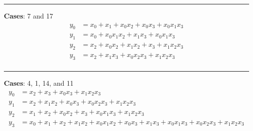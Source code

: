 \begin{minipage}{.8\textwidth}


\hrule
\vspace{2em}

\noindent 
\textbf{Cases}: 7 and 17
\begin{align*}
y_0 & = x_0 + x_1 + x_0x_2 + x_0x_3 + x_0x_1x_3 \\
y_1 & = x_0 + x_0x_1x_2 + x_1x_3 + x_0x_1x_3 \\
y_2 & = x_2 + x_0x_2 + x_1x_2 + x_3 + x_1x_2x_3 \\
y_3 & = x_2 + x_1x_3 + x_0x_2x_3 + x_1x_2x_3 \\
\end{align*}
\vspace{-1em}



\hrule
\vspace{2em}

\noindent 

\textbf{Cases}: 4, 1, 14, and 11
\begin{align*}
y_0 & = x_2 + x_3 + x_0x_3 + x_1x_2x_3 \\
y_1 & = x_2 + x_1x_2 + x_0x_3 + x_0x_2x_3 + x_1x_2x_3 \\
y_2 & = x_1 + x_2 + x_0x_2 + x_3 + x_0x_1x_3 + x_1x_2x_3 \\
y_3 & = x_0 + x_1 + x_2 + x_1x_2 + x_0x_1x_2 + x_0x_3 + x_1x_3 + x_0x_1x_3 + x_0x_2x_3 + x_1x_2x_3 \\
\end{align*}
\vspace{-1em}


\end{minipage}
